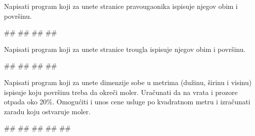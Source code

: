 \begin{Exercise}[label=p1_02] 
Napisati program koji za unete stranice pravougaonika ispisuje njegov obim i površinu.\\
\begin{miditest}
\begin{upotreba}{1}
#\naslovInt#
##
##
##
\end{upotreba}
\end{miditest}
\end{Exercise}
\begin{Answer}[ref=p1_02]
\end{Answer}



\begin{Exercise}[label=p1_03] 
Napisati program koji za unete stranice trougla ispisuje njegov obim i površinu.\\
\begin{miditest}
\begin{upotreba}{1}
#\naslovInt#
##
##
##
\end{upotreba}
\end{miditest}
\end{Exercise}
\begin{Answer}[ref=p1_03]
\end{Answer}


\begin{Exercise}[label=p1_04] 
Napisati program koji za unete dimenzije sobe u metrima (dužinu, širinu i visinu) ispisuje koju površinu treba da okreči moler. Uračunati da na vrata i prozore otpada oko 20\%. Omogućiti i unos cene usluge po kvadratnom metru i izračunati zaradu koju ostvaruje moler.\\
\begin{miditest}
\begin{upotreba}{1}
#\naslovInt#
##
##
##
##
\end{upotreba}
\end{miditest}
\end{Exercise}
\begin{Answer}[ref=p1_04]
\end{Answer}




